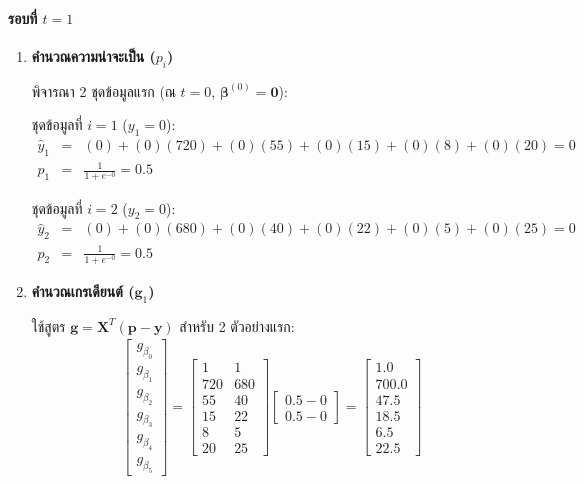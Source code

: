 \paragraph{รอบที่ $t = 1$}
\begin{enumerate}
    \item \textbf{คำนวณความน่าจะเป็น ($p_i$)}
    
    พิจารณา 2 ชุดข้อมูลแรก (ณ $t=0$, $\boldsymbol{\beta}^{(0)} = \mathbf{0}$):

    ชุดข้อมูลที่ $i=1$ ($y_1 = 0$):
    \begin{eqnarray} \nonumber
        \hat{y}_1 &=& (0) + (0)(720) + (0)(55) + (0)(15) + (0)(8) + (0)(20) = 0 \\ \nonumber
        p_1 &=& \frac{1}{1 + e^{-0}} = 0.5
    \end{eqnarray}

    ชุดข้อมูลที่ $i=2$ ($y_2 = 0$):
    \begin{eqnarray} \nonumber
        \hat{y}_2 &=& (0) + (0)(680) + (0)(40) + (0)(22) + (0)(5) + (0)(25) = 0 \\ \nonumber
        p_2 &=& \frac{1}{1 + e^{-0}} = 0.5
    \end{eqnarray}

    \item \textbf{คำนวณเกรเดียนต์ ($\mathbf{g}_1$)}
    
    ใช้สูตร $\mathbf{g} = \mathbf{X}^T(\mathbf{p} - \mathbf{y})$ สำหรับ 2 ตัวอย่างแรก:
    \begin{eqnarray} \nonumber
        \begin{bmatrix} g_{\beta_0} \\ g_{\beta_1} \\ g_{\beta_2} \\ g_{\beta_3} \\ g_{\beta_4} \\ g_{\beta_5} \end{bmatrix}
        = 
        \begin{bmatrix} 1 & 1 \\ 720 & 680 \\ 55 & 40 \\ 15 & 22 \\ 8 & 5 \\ 20 & 25 \end{bmatrix}
        \begin{bmatrix} 0.5 - 0 \\ 0.5 - 0 \end{bmatrix}
        =
        \begin{bmatrix} 1.0 \\ 700.0 \\ 47.5 \\ 18.5 \\ 6.5 \\ 22.5 \end{bmatrix}
    \end{eqnarray}


\end{enumerate}
